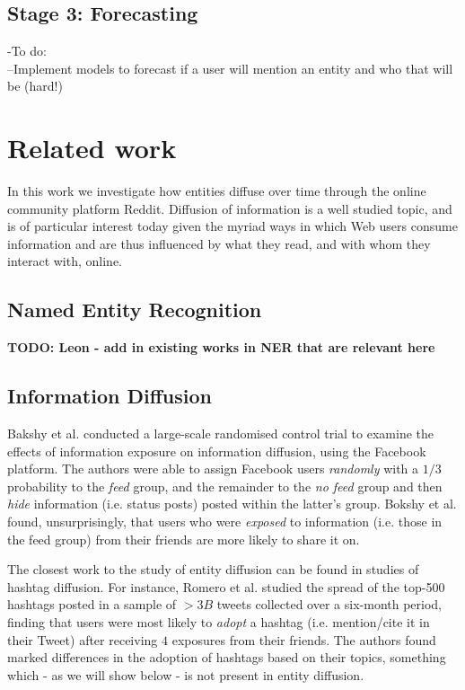 \documentclass[journal,10pt,draftclsnofoot,onecolumn]{IEEEtran}
\begin{document}
\subsection{Stage 3: Forecasting}
-To do:\\
--Implement models to forecast if a user will mention an entity and who that will be (hard!)



\section{Related work}
In this work we investigate how entities diffuse over time through the online community platform Reddit.
Diffusion of information is a well studied topic, and is of particular interest today given the myriad ways in which Web users consume information and are thus influenced by what they read, and with whom they interact with, online.

\subsection{Named Entity Recognition}
\textbf{TODO: Leon - add in existing works in NER that are relevant here}

\subsection{Information Diffusion}
Bakshy et al. \cite{bakshy2012role} conducted a large-scale randomised control trial to examine the effects of information exposure on information diffusion, using the Facebook platform.
The authors were able to assign Facebook users \emph{randomly} with a $1/3$ probability to the \emph{feed} group, and the remainder to the \emph{no feed} group and then \emph{hide} information (i.e. status posts) posted within the latter's group.
Bokshy et al. found, unsurprisingly, that users who were \emph{exposed} to information (i.e. those in the feed group) from their friends are more likely to share it on.

The closest work to the study of entity diffusion can be found in studies of hashtag diffusion.
For instance, Romero et al. \cite{romero2011differences} studied the spread of the top-500 hashtags posted in a sample of $>3B$ tweets collected over a six-month period, finding that users were most likely to \emph{adopt} a hashtag (i.e. mention/cite it in their Tweet) after receiving $4$ exposures from their friends.
The authors found marked differences in the adoption of hashtags based on their topics, something which - as we will show below - is not present in entity diffusion.
\end{document}
